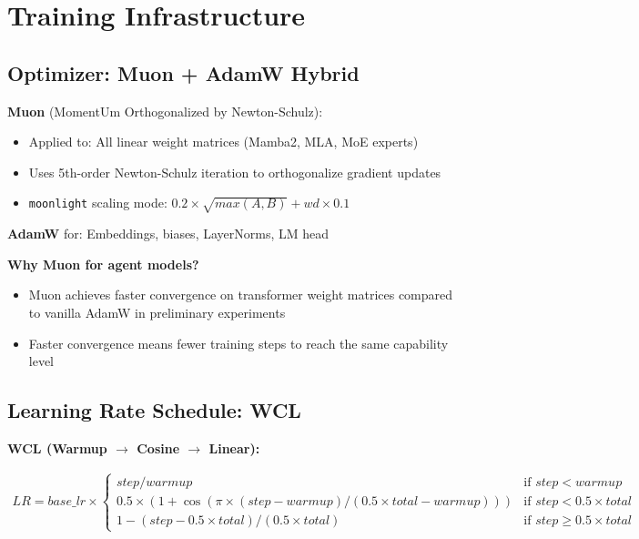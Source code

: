 \section{Training Infrastructure}
\label{sec:training}

\subsection{Optimizer: Muon + AdamW Hybrid}

\textbf{Muon} \citep{muon} (MomentUm Orthogonalized by Newton-Schulz):
\begin{itemize}
    \item Applied to: All linear weight matrices (Mamba2, MLA, MoE experts)
    \item Uses 5th-order Newton-Schulz iteration to orthogonalize gradient updates
    \item \texttt{moonlight} scaling mode: $0.2 \times \sqrt{max(A, B)} + wd \times 0.1$
\end{itemize}

\textbf{AdamW} for: Embeddings, biases, LayerNorms, LM head

\textbf{Why Muon for agent models?}
\begin{itemize}
    \item Muon achieves faster convergence on transformer weight matrices compared to vanilla AdamW in preliminary experiments
    \item Faster convergence means fewer training steps to reach the same capability level
\end{itemize}

\subsection{Learning Rate Schedule: WCL}

\textbf{WCL (Warmup $\rightarrow$ Cosine $\rightarrow$ Linear):}

\begin{align}
    LR = base\_lr \times \begin{cases}
        step / warmup & \text{if } step < warmup \\
        0.5 \times (1 + \cos(\pi \times (step - warmup) / (0.5 \times total - warmup))) & \text{if } step < 0.5 \times total \\
        1 - (step - 0.5 \times total) / (0.5 \times total) & \text{if } step \ge 0.5 \times total
    \end{cases}
\end{align}

